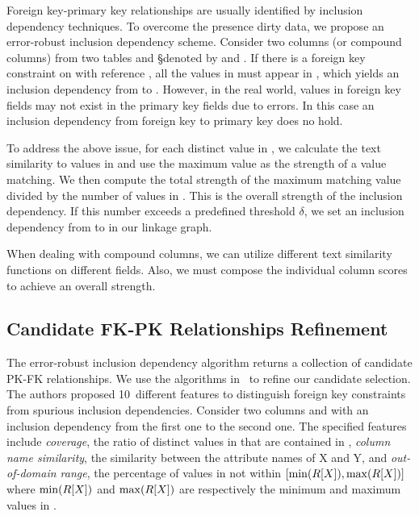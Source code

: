 Foreign key-primary key relationships are usually identified by inclusion
dependency techniques.  To overcome the presence  dirty data, we propose an error-robust
inclusion dependency scheme.
Consider two columns (or compound columns) from two tables \R and \S denoted by
\RX and \SY. If there is a foreign key constraint on \RX with reference \SY, all
the values in \RX must appear in \SY, which yields an inclusion dependency from
\RX to \SY. However, in the real world, values in foreign key fields may not
exist in the primary key fields due to errors.  In this case an inclusion
dependency from foreign key to primary key does no hold.

To address the above issue, for each distinct value in \RX, we calculate the
text similarity to values in \SY and use the maximum value as the strength of a
value matching. We then compute the total strength of the maximum matching value
divided by the number of values in \RX. This is the overall strength of the
inclusion dependency.  If this number exceeds a predefined threshold $\delta$,
we set an inclusion dependency from \RX to \SY in our linkage graph.

When dealing with compound columns, we can utilize different text similarity functions on different fields. 
Also, we must compose the individual column scores to achieve an overall strength.


\subsection{Candidate FK-PK Relationships Refinement}
\label{subsec:refine}


The error-robust inclusion dependency algorithm returns a collection of candidate PK-FK relationships.
We use the algorithms in~\cite{DBLP:conf/webdb/RostinABNL09} 
to refine our candidate selection. The authors proposed 10~different features to distinguish foreign key constraints from spurious inclusion dependencies. Consider two columns \RX and \SY with an inclusion dependency from the first one to the second one. 
The specified features include 
\emph{coverage}, the ratio of distinct values in \RX that are contained in \SY, 
\emph{column name similarity}, the similarity between the attribute names of X and Y, 
and \emph{out-of-domain range}, the percentage of values in \SY not within $[\min(R[X]), \max(R[X])]$ where $\min(R[X])$ and $\max(R[X])$ are respectively the minimum and maximum values in \RX.

